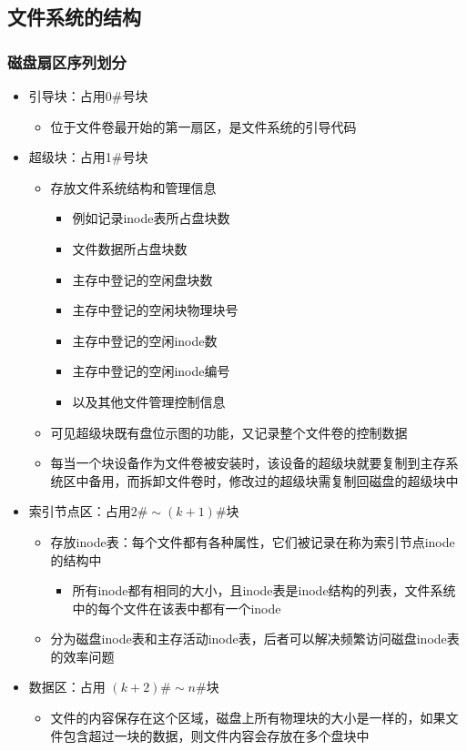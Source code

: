 \documentclass[cs4size,a4paper,10pt]{ctexart}
\begin{document}
	\subsection{文件系统的结构}

	\subsubsection{磁盘扇区序列划分}
	\begin{itemize}
		\item 引导块：占用0\#号块
		\begin{itemize}
			\item 位于文件卷最开始的第一扇区，是文件系统的引导代码
		\end{itemize}
		\item 超级块：占用1\#号块
		\begin{itemize}
			\item 存放文件系统结构和管理信息
			\begin{itemize}
				\item 例如记录inode表所占盘块数
				\item 文件数据所占盘块数
				\item 主存中登记的空闲盘块数
				\item 主存中登记的空闲块物理块号
				\item 主存中登记的空闲inode数
				\item 主存中登记的空闲inode编号
				\item 以及其他文件管理控制信息
			\end{itemize}
			\item 可见超级块既有盘位示图的功能，又记录整个文件卷的控制数据
			\item 每当一个块设备作为文件卷被安装时，该设备的超级块就要复制到主存系统区中备用，而拆卸文件卷时，修改过的超级块需复制回磁盘的超级块中
		\end{itemize}
		\item 索引节点区：占用$2\# \sim (k+1)\#$块
		\begin{itemize}
			\item 存放inode表：每个文件都有各种属性，它们被记录在称为索引节点inode的结构中
			\begin{itemize}
				\item 所有inode都有相同的大小，且inode表是inode结构的列表，文件系统中的每个文件在该表中都有一个inode
			\end{itemize}
			\item 分为磁盘inode表和主存活动inode表，后者可以解决频繁访问磁盘inode表的效率问题
		\end{itemize}
		\item 数据区：占用 $(k+2)\# \sim n\#$块
		\begin{itemize}
			\item 文件的内容保存在这个区域，磁盘上所有物理块的大小是一样的，如果文件包含超过一块的数据，则文件内容会存放在多个盘块中
		\end{itemize}
	\end{itemize}
\end{document}
